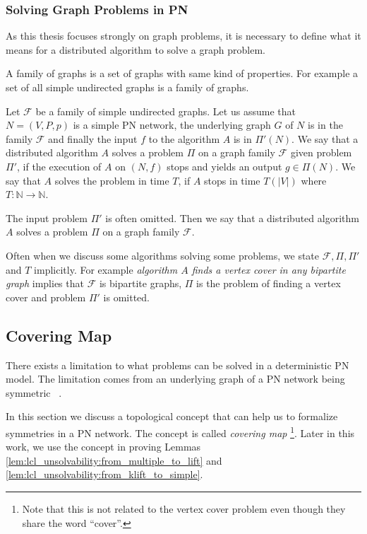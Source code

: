 \subsubsection{Solving Graph Problems in PN}
As this thesis focuses strongly on graph problems, it is necessary to define what it means for a distributed algorithm to solve a graph problem.

A family of graphs is a set of graphs with same kind of properties.
For example a set of all simple undirected graphs is a family of graphs.

Let $\mathcal{F}$ be a family of simple undirected graphs.
Let us assume that $N=(V, P, p)$ is a simple PN network, the underlying graph $G$ of $N$ is in the family $\mathcal{F}$ and finally the input $f$ to the algorithm $A$ is in $\Pi'(N)$.
We say that a distributed algorithm $A$ solves a problem $\Pi$ on a graph family $\mathcal{F}$ given problem $\Pi'$, if the execution of $A$ on $(N, f)$ stops and yields an output $g \in \Pi(N)$.
We say that $A$ solves the problem in time $T$, if $A$ stops in time $T(|V|)$ where $T\colon \mathbb{N} \rightarrow \mathbb{N}$.

The input problem $\Pi'$ is often omitted.
Then we say that a distributed algorithm $A$ solves a problem $\Pi$ on a graph family $\mathcal{F}$.

Often when we discuss some algorithms solving some problems, we state $\mathcal{F}, \Pi, \Pi'$ and $T$ implicitly.
For example \emph{algorithm $A$ finds a vertex cover in any bipartite graph} implies that $\mathcal{F}$ is bipartite graphs, $\Pi$ is the problem of finding a vertex cover and problem $\Pi'$ is omitted.


\subsection{Covering Map} \label{sec:covering_map}
There exists a limitation to what problems can be solved in a deterministic PN model.
The limitation comes from an underlying graph of a PN network being symmetric~%
.

In this section we discuss a topological concept that can help us to formalize symmetries in a PN network.
The concept is called \emph{covering map}%
\footnote{Note that this is not related to the vertex cover problem even though they share the word ``cover''.}.
Later in this work, we use the concept in proving Lemmas \ref{lem:lcl_unsolvability:from_multiple_to_lift} and \ref{lem:lcl_unsolvability:from_klift_to_simple}.

